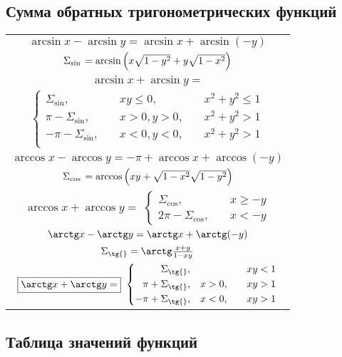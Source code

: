 \subsection{Сумма обратных тригонометрических функций}

\begin{tabu}[t]{||c||}
	\hline
		$ \arcsin x - \arcsin y =  \arcsin x + \arcsin(-y) $ \\
		$ \Sigma_{\sin{}} = \arcsin\left(x\sqrt{\mathstrut 1-y^2}+y\sqrt{\mathstrut 1-x^2}\right) $ \\
	\hline
		$ \boxed{\arcsin x + \arcsin y =} $ \\
		$ \left\{ \begin{aligned}
			\Sigma_{\sin{}}, \quad & xy \leqslant 0,\quad & x^2 + y^2 \leqslant 1 \\
			\pi-\Sigma_{\sin{}}, \quad & x > 0, y > 0,\quad  & x^2 + y^2 > 1 \\
			-\pi-\Sigma_{\sin{}}, \quad & x < 0, y < 0,\quad & x^2 + y^2 > 1 \\
		\end{aligned} \right. $ \\
	\hline
	\hline
		$ \arccos x - \arccos y =  -\pi + \arccos x + \arccos(-y) $ \\
		$ \Sigma_{\cos{}} = \arccos\left(xy+\sqrt{\mathstrut 1-x^2}\sqrt{\mathstrut 1-y^2}\right) $ \\
	\hline
		$ \boxed{\arccos x + \arccos y =} $
		$ \left\{ \begin{aligned}
			\Sigma_{\cos{}}, \quad & x \geqslant -y \\
			2\pi-\Sigma_{\cos{}}, \quad & x < -y
		\end{aligned} \right. $ \\
	\hline
	\hline
		$ \arctg x - \arctg y =  \arctg x + \arctg(-y) $ \\
		$ \Sigma_{\tg{}} = \arctg\frac{x+y}{1-xy} $ \\
	\hline
		$ \boxed{\arctg x + \arctg y =} $
		$ \left\{ \begin{aligned}
			\Sigma_{\tg{}}, \quad & & xy < 1 \\
			\pi+\Sigma_{\tg{}}, \quad & x > 0, \quad & xy>1 \\
			-\pi+\Sigma_{\tg{}}, \quad & x < 0, \quad & xy>1 \\
		\end{aligned} \right. $ \\
	\hline
\end{tabu}

\subsection{Таблица значений функций}

